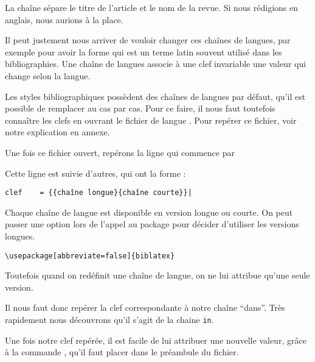 	 
	 
	\begin{quotation}
		\cite{Junod1992}
	\end{quotation}
	
	La chaîne  sépare le titre de l'article et le nom de la revue. Si nous rédigions en anglais, nous aurions  à la place.  
	
	
	Il peut justement nous arriver de vouloir changer ces chaînes de langues, par exemple pour avoir la forme  qui est un terme latin souvent utilisé dans les bibliographies.  Une chaîne de langues associe à une clef invariable une valeur qui change selon la langue.
	
	Les styles bibliographiques possèdent des chaînes de langues par défaut, qu'il est possible de remplacer au cas par cas. Pour ce faire, il nous faut toutefois connaître les clefs en ouvrant le fichier de langue . Pour repérer ce fichier, voir notre explication en annexe.
	
	Une fois ce fichier ouvert, repérons la ligne qui commence par

	
	Cette ligne est suivie d'autres, qui ont la forme :
	
	\begin{verbatim}
clef	= {{chaîne longue}{chaîne courte}}|
	\end{verbatim}
	
	\begin{plusloins}
	Chaque chaîne de langue est disponible en version longue ou courte. On peut passer une option lors de l'appel au package  pour décider d'utiliser les versions longues.
	
	\begin{verbatim}
\usepackage[abbreviate=false]{biblatex}
	\end{verbatim}
	
	 Toutefois quand on redéfinit une chaîne de langue, on ne lui attribue qu'une seule version.
	
	\end{plusloins}
	
	Il nous faut donc repérer la clef correspondante à notre chaîne \enquote{dans}. Très rapidement nous découvrons qu'il s'agit de la chaine \verb|in|.
	
	Une fois  notre clef repérée, il est facile de lui attribuer une nouvelle valeur, grâce à la commande , qu'il faut placer dans le préambule du fichier.
	

